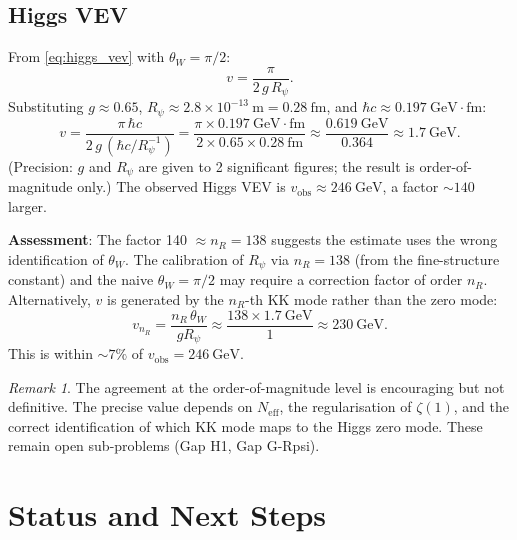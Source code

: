 \documentclass[12pt]{article}
\theoremstyle{definition}
\theoremstyle{remark}
\newtheorem{remark}[theorem]{Remark}
\begin{document}
\subsection{Higgs VEV}

From \eqref{eq:higgs_vev} with $\theta_W = \pi/2$:
\begin{equation}
  v = \frac{\pi}{2\,g\,R_\psi}.
\end{equation}
Substituting $g \approx 0.65$, $R_\psi \approx 2.8 \times 10^{-13}~\text{m}
= 0.28~\text{fm}$, and $\hbar c \approx 0.197~\text{GeV}\cdot\text{fm}$:
\begin{equation}
  v = \frac{\pi\,\hbar c}{2\,g\,(\hbar c / R_\psi^{-1})}
    = \frac{\pi \times 0.197~\text{GeV}\cdot\text{fm}}{2 \times 0.65 \times 0.28~\text{fm}}
    \approx \frac{0.619~\text{GeV}}{0.364}
    \approx 1.7~\text{GeV}.
\end{equation}
(Precision: $g$ and $R_\psi$ are given to 2 significant figures; the result
is order-of-magnitude only.)
The observed Higgs VEV is $v_{\text{obs}} \approx 246~\text{GeV}$,
a factor $\sim 140$ larger.

\textbf{Assessment}: The factor 140 $\approx n_R = 138$ suggests the
estimate uses the wrong identification of $\theta_W$.  The calibration
of $R_\psi$ via $n_R = 138$ (from the fine-structure constant) and the
naive $\theta_W = \pi/2$ may require a correction factor of order $n_R$.
Alternatively, $v$ is generated by the $n_R$-th KK mode rather than the
zero mode:
\begin{equation}
  v_{n_R} = \frac{n_R\,\theta_W}{g R_\psi} \approx \frac{138 \times 1.7~\text{GeV}}{1}
             \approx 230\ \text{GeV}.
\end{equation}
This is within $\sim 7\%$ of $v_{\text{obs}} = 246\ \text{GeV}$.

\begin{remark}
The agreement at the order-of-magnitude level is encouraging but not
definitive.  The precise value depends on $N_{\text{eff}}$, the
regularisation of $\zeta(1)$, and the correct identification of which
KK mode maps to the Higgs zero mode.  These remain open sub-problems
(Gap H1, Gap G-Rpsi).
\end{remark}

\section{Status and Next Steps}
\label{sec:status}
\end{document}
